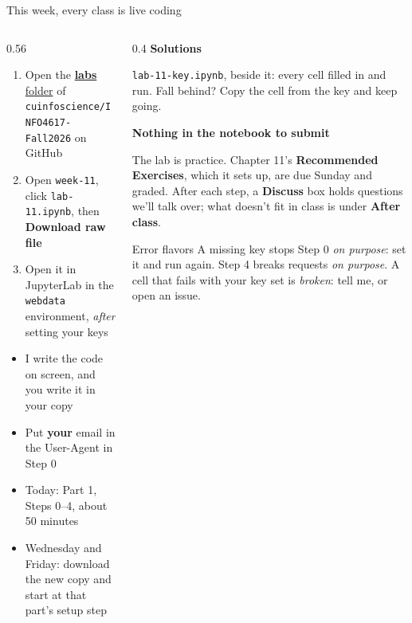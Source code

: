 \documentclass[9pt,aspectratio=169]{beamer}
\begin{document}
\begin{frame}{This week, every class is live coding}
    \begin{columns}[T]
        \begin{column}{0.56\textwidth}
            \begin{enumerate}\small
                \item Open the \href{https://github.com/cuinfoscience/INFO4617-Fall2026/tree/main/labs}{\textbf{labs} folder} of \texttt{cuinfoscience/INFO4617-Fall2026} on GitHub
                \item Open \texttt{week-11}, click \texttt{lab-11.ipynb}, then \textbf{Download raw file}
                \item Open it in JupyterLab in the \texttt{webdata} environment, \textit{after} setting your keys
            \end{enumerate}

            \medskip
            \begin{itemize}\small
                \item I write the code on screen, and you write it in your copy
                \item Put \textbf{your} email in the User-Agent in Step 0
                \item Today: Part 1, Steps 0--4, about 50 minutes
                \item Wednesday and Friday: download the new copy and start at that part's setup step
            \end{itemize}
        \end{column}
        \begin{column}{0.4\textwidth}
            \textbf{Solutions}\\[2pt]
            {\footnotesize \texttt{lab-11-key.ipynb}, beside it: every cell filled in and run. Fall behind? Copy the cell from the key and keep going.\par}
            \medskip
            \textbf{Nothing in the notebook to submit}\\[2pt]
            {\footnotesize The lab is practice. Chapter 11's \textbf{Recommended Exercises}, which it sets up, are due Sunday and graded. After each step, a \textbf{Discuss} box holds questions we'll talk over; what doesn't fit in class is under \textbf{After class}.\par}
            \medskip
            \begin{alertblock}{Error flavors}
                \footnotesize A missing key stops Step 0 \textit{on purpose}: set it and run again. Step 4 breaks requests \textit{on purpose}. A cell that fails with your key set is \textit{broken}: tell me, or open an issue.
            \end{alertblock}
        \end{column}
    \end{columns}
\end{frame}
\end{document}
